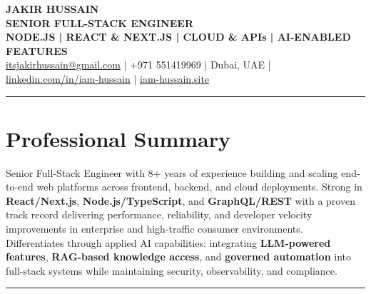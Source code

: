 \documentclass[10pt,a4paper]{article}
\newcommand{\NameSize}{\fontsize{22}{24}\selectfont}
\newcommand{\TitleSize}{\fontsize{10.8}{13}\selectfont}
\newcommand{\TagSize}{\fontsize{10}{12}\selectfont}
\newcommand{\BodySize}{\fontsize{9.7}{12}\selectfont}
\newcommand{\SmallBody}{\fontsize{9.2}{11.4}\selectfont}
\newcommand{\topdivider}{\color{rulecolor}\rule{\linewidth}{0.5pt}\color{primary}\vspace{0pt}}
\begin{document}
\BodySize

\begin{center}
{\NameSize \bfseries JAKIR HUSSAIN}\\[4pt]
{\TitleSize \bfseries SENIOR FULL-STACK ENGINEER}\\[2pt]
{\TagSize \bfseries NODE.JS \;|\; REACT \& NEXT.JS \;|\; CLOUD \& APIs \;|\; AI-ENABLED FEATURES}\\[6pt]

\href{mailto:itsjakirhussain@gmail.com}{itsjakirhussain@gmail.com} \;|\;
+971 551419969 \;|\;
Dubai, UAE \;|\;
\href{https://linkedin.com/in/iam-hussain}{linkedin.com/in/iam-hussain} \;|\;
\href{https://iam-hussain.site}{iam-hussain.site}
\end{center}
\vspace{-8pt}
\topdivider
\vspace{2pt}

\section*{Professional Summary}
\SmallBody
Senior Full-Stack Engineer with 8+ years of experience building and scaling end-to-end web platforms across frontend, backend, and cloud deployments. Strong in \textbf{React/Next.js}, \textbf{Node.js/TypeScript}, and \textbf{GraphQL/REST} with a proven track record delivering performance, reliability, and developer velocity improvements in enterprise and high-traffic consumer environments.\\[4pt]
Differentiates through applied AI capabilities: integrating \textbf{LLM-powered features}, \textbf{RAG-based knowledge access}, and \textbf{governed automation} into full-stack systems while maintaining security, observability, and compliance.

\vspace{1pt}
\topdivider
\vspace{2pt}
\end{document}

